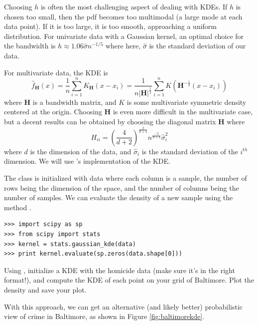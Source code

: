 Choosing $h$ is often the most challenging aspect of dealing with KDEs. If $h$ is chosen too small, then the pdf becomes too multimodal (a large mode at each data point). If it is too large, it is too smooth, approaching a uniform distribution. For univariate data with a Gaussian kernel, an optimal choice for the bandwidth is $h \approx 1.06\widehat{\sigma}n^{-1/5}$ where here, $\widehat{\sigma}$ is the standard deviation of our data.

For multivariate data, the KDE is 
\begin{equation*}
\widehat{f}_{\mathbf{H}}(x) = \frac{1}{n} \sum_{i=1}^{n} K_{\mathbf{H}}(x - x_{i}) = \frac{1}{n\lvert \mathbf{H} \rvert^{\frac{1}{2}}} \sum_{i=1}^{n} K(\mathbf{H}^{-\frac{1}{2}}(x - x_{i}))
\end{equation*}
where $\mathbf{H}$ is a bandwidth matrix, and $K$ is some multivariate symmetric density centered at the origin. Choosing $\mathbf{H}$ is even more difficult in the multivariate case, but a decent results can be obtained by choosing the diagonal matrix $\mathbf{H}$ where 
\begin{equation*}
H_{ii} = (\frac{4}{d+2})^{\frac{2}{d+4}} n^{\frac{-2}{d+4}} \widehat{\sigma}_{i}^{2}
\end{equation*}
where $d$ is the dimension of the data, and $\widehat{\sigma}_{i}$ is the standard deviation of the $i^{th}$ dimension. We will use 's implementation of the KDE.

The  class is initialized with data where each column is a sample, the number of rows being the dimension of the space, and the number of columns being the number of samples. We can evaluate the density of a new sample using the method .
\begin{lstlisting}
>>> import scipy as sp
>>> from scipy import stats
>>> kernel = stats.gaussian_kde(data)
>>> print kernel.evaluate(sp.zeros(data.shape[0]))
\end{lstlisting}

\begin{problem}
Using , initialize a KDE with the homicide data (make sure it's in the right format!), and compute the KDE of each point on your grid of Baltimore. Plot the density and save your plot.
\end{problem}

With this approach, we can get an alternative (and likely better) probabilistic view of crime in Baltimore, as shown in Figure \ref{fig:baltimorekde}.

